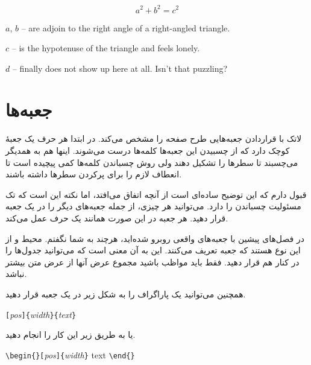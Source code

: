 \begin{example}
\flushleft
\newenvironment{vardesc}[1]{%
  \settowidth{\parindent}{#1:\ }
  \makebox[0pt][r]{#1:\ }}{}

\begin{displaymath}
a^2+b^2=c^2
\end{displaymath}

\begin{vardesc}{Where}$a$, 
$b$ -- are adjoin to the right 
angle of a right-angled triangle.  

$c$ -- is the hypotenuse of 
the triangle and feels lonely.

$d$ -- finally does not show up 
here at all. Isn't that puzzling?
\end{vardesc}
\end{example}

\section{جعبه‌ها}
لاتک با قراردادن جعبه‌هایی طرح صفحه را مشخص می‌کند. در ابتدا هر حرف یک جعبهٔ کوچک دارد که  از چسبیدن این جعبه‌ها کلمه‌ها درست می‌شوند.  اینها هم به همدیگر می‌چسبند تا سطرها را تشکیل دهند ولی روش چسباندن کلمه‌ها کمی پیچیده است تا انعطاف لازم را برای پرکردن سطرها داشته باشند.

قبول دارم که این توضیح ساده‌ای است از آنچه اتفاق می‌افتد، اما نکته این است که تک مسئولیت چسباندن را دارد. می‌توانید هر چیزی، از جمله جعبه‌های دیگر را در یک جعبه قرار دهید. هر جعبه در این صورت همانند یک حرف عمل می‌کند.

در فصل‌های پیشین با جعبه‌های واقعی روبرو شده‌اید، هرچند به شما نگفتم. محیط   و  از این نوع هستند که جعبه تعریف می‌کنند. این به آن معنی است که می‌توانید جدول‌ها را در کنار هم قرار دهید. فقط باید مواظب باشید مجموع عرض آنها از عرض متن بیشتر نباشد.

همچنین می‌توانید یک پاراگراف را به شکل زیر در یک جعبه قرار دهید.


\begin{lscommand}
\verb|[|\emph{pos}\verb|]{|\emph{width}\verb|}{|\emph{text}\verb|}|
\end{lscommand}

 

\noindent یا به طریق زیر این کار را انجام دهید.


\begin{lscommand}
\verb|\begin{|\verb|}[|\emph{pos}\verb|]{|\emph{width}\verb|}| text
\verb|\end{|\verb|}|
\end{lscommand}


